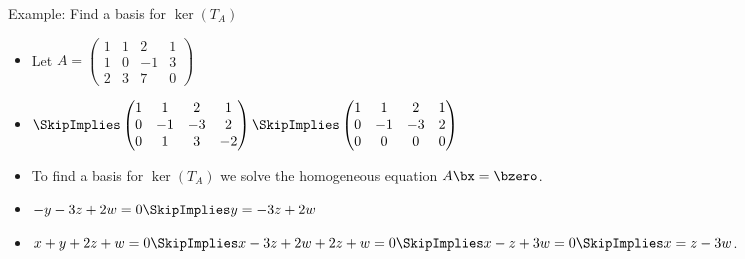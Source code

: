 \documentclass{beamer}
\begin{document}
\begin{frame}{Example: Find a basis for $\ker(T_A)$}

\begin{itemize}
\item Let $A=
\begin{pmatrix}
1 & 1 & 2 & 1  \\
1 & 0 & -1 & 3  \\
2 & 3 & 7 & 0
\end{pmatrix}
$
\item $
\SkipImplies
\begin{pmatrix}
1 & 1 & 2 & 1 \\
0 & -1 & -3 & 2  \\
0 & 1 & 3 & -2
\end{pmatrix}
\SkipImplies
\begin{pmatrix}
1 & 1 & 2 & 1  \\
0 & -1 & -3 & 2 \\
0 & 0 & 0 & 0
\end{pmatrix}
$
\item To find a basis for $\ker(T_A)$ we solve the homogeneous equation $A\bx=\bzero$.
\item $-y -3z + 2w = 0 \SkipImplies y = -3z + 2w$
\item $x + y +2z + w = 0 \SkipImplies x -3z + 2w + 2z + w = 0 \SkipImplies x-z+3w = 0 \SkipImplies x = z-3w$.
\end{itemize}

\end{frame}

\end{document}
